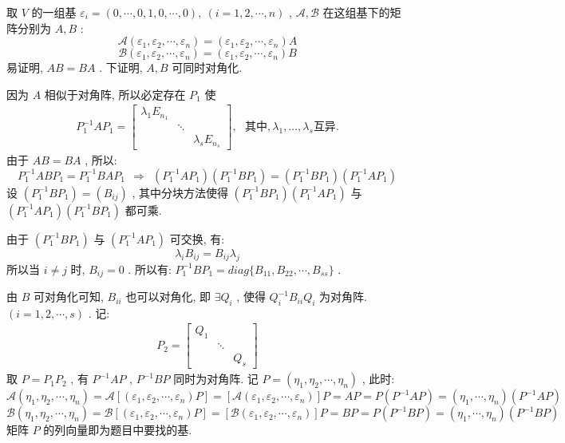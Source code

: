 \documentclass[11pt,a4paper,openany,oneside]{book}
\begin{document}
取 $ V $ 的一组基 $ \varepsilon_i = (0, \cdots, 0, 1, 0, \cdots, 0), \ (i=1, 2, \cdots, n) $ ,  $ \mathcal{A}, \mathcal{B} $ 在这组基下的矩阵分别为 $ A, B $ :
 $$  \mathcal{A}(\varepsilon_1, \varepsilon_2, \cdots, \varepsilon_n) = (\varepsilon_1, \varepsilon_2, \cdots, \varepsilon_n)A  $$ 
 $$  \mathcal{B}(\varepsilon_1, \varepsilon_2, \cdots, \varepsilon_n) = (\varepsilon_1, \varepsilon_2, \cdots, \varepsilon_n)B  $$ 
易证明,  $ AB = BA $ . 下证明,  $ A, B $ 可同时对角化.

因为 $ A $ 相似于对角阵, 所以必定存在 $ P_1 $ 使
\begin{gather*}
P_1^{-1}AP_1 = 
\begin{bmatrix}
\lambda_1E_{n_1}  &         &          \\
&  \ddots &          \\
&         &  \lambda_sE_{n_s}
\end{bmatrix}, \ \ \ \text{其中}, \lambda_1, \dots, \lambda_s \text{互异}.
\end{gather*}
由于 $ AB = BA $ , 所以:
 $$  P_1^{-1}ABP_1 = P_1^{-1}BAP_1 \ \ \Rightarrow \ \ (P_1^{-1}AP_1)(P_1^{-1}BP_1) = (P_1^{-1}BP_1)(P_1^{-1}AP_1)   $$ 
设 $ (P_1^{-1}BP_1) = (B_{ij}) $ , 其中分块方法使得 $ (P_1^{-1}BP_1)(P_1^{-1}AP_1) $ 与 $ (P_1^{-1}AP_1)(P_1^{-1}BP_1) $ 都可乘.

由于 $ (P_1^{-1}BP_1) $ 与 $ (P_1^{-1}AP_1) $ 可交换, 有:
 $$  \lambda_iB_{ij} = B_{ij}\lambda_j  $$ 
所以当 $ i \neq j $ 时,  $ B_{ij} = 0 $ . 所以有:  $ P_1^{-1}BP_1 = diag\{ B_{11}, B_{22}, \cdots, B_{ss} \} $ .

由 $ B $ 可对角化可知,  $ B_{ii} $ 也可以对角化, 即 $ \exists Q_i $ , 使得 $ Q_i^{-1}B_{ii}Q_i $ 为对角阵. $ (i=1, 2, \cdots, s) $ . 记:
\begin{gather*}
P_2 = 
\begin{bmatrix}
Q_1  &      &       \\
&  \ddots  &    \\
&              & Q_s 
\end{bmatrix}
\end{gather*}
取 $ P = P_1P_2 $ , 有 $ P^{-1}AP $ ,  $ P^{-1}BP $ 同时为对角阵. 记 $ P=(\eta_1, \eta_2, \cdots, \eta_n) $ , 此时:
 $$  \mathcal{A}(\eta_1, \eta_2, \cdots, \eta_n) = \mathcal{A}[(\varepsilon_1, \varepsilon_2, \cdots, \varepsilon_n)P] = [\mathcal{A}(\varepsilon_1, \varepsilon_2, \cdots, \varepsilon_n)]P = AP = P(P^{-1}AP)=(\eta_1, \cdots, \eta_n)(P^{-1}AP)  $$ 
 $$  \mathcal{B}(\eta_1, \eta_2, \cdots, \eta_n) = \mathcal{B}[(\varepsilon_1, \varepsilon_2, \cdots, \varepsilon_n)P] = [\mathcal{B}(\varepsilon_1, \varepsilon_2, \cdots, \varepsilon_n)]P = BP =P(P^{-1}BP)= (\eta_1, \cdots, \eta_n)(P^{-1}BP)  $$ 
矩阵 $ P $ 的列向量即为题目中要找的基.
\end{document}
